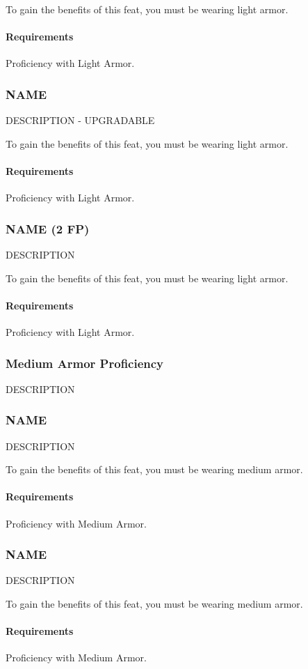     To gain the benefits of this feat, you must be wearing light armor.
    \paragraph{Requirements} Proficiency with Light Armor.
\subsubsection{NAME} \label{feat::name}
    DESCRIPTION - UPGRADABLE

    To gain the benefits of this feat, you must be wearing light armor.
    \paragraph{Requirements} Proficiency with Light Armor.
\subsubsection{NAME (2 FP)} \label{feat::name}
    DESCRIPTION

    To gain the benefits of this feat, you must be wearing light armor.
    \paragraph{Requirements} Proficiency with Light Armor.
\subsubsection{Medium Armor Proficiency} \label{feat::name}
    DESCRIPTION
\subsubsection{NAME} \label{feat::name}
    DESCRIPTION

    To gain the benefits of this feat, you must be wearing medium armor.
    \paragraph{Requirements} Proficiency with Medium Armor.
\subsubsection{NAME} \label{feat::name}
    DESCRIPTION

    To gain the benefits of this feat, you must be wearing medium armor.
    \paragraph{Requirements} Proficiency with Medium Armor.

